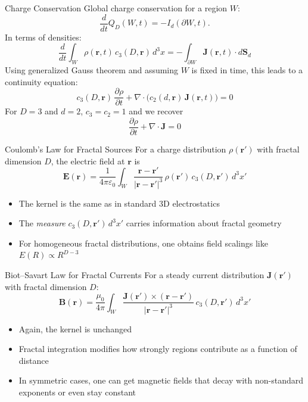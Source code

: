 \documentclass[11pt]{beamer}
\begin{document}
\begin{frame}{Charge Conservation}
Global charge conservation for a region $W$:
\begin{equation*}
  \frac{d}{dt} Q_D(W,t) = - I_d(\partial W,t) .
\end{equation*}
In terms of densities:
\begin{equation*}
  \frac{d}{dt} \int_W \rho(\bm r,t)\, c_3(D,\bm r)\, d^3x
  = - \int_{\partial W} \bm J(\bm r,t) \cdot d\bm S_d
\end{equation*}
Using generalized Gauss theorem and assuming $W$ is fixed in time, this leads to a continuity equation:
\begin{equation*}
  c_3(D,\bm r)\, \frac{\partial \rho}{\partial t}
  + \nabla \cdot \bigl( c_2(d,\bm r)\, \bm J(\bm r,t) \bigr) = 0
\end{equation*}
For $D = 3$ and $d = 2$, $c_3 = c_2 = 1$ and we recover
\begin{equation*}
  \frac{\partial \rho}{\partial t} + \nabla \cdot \bm J = 0
\end{equation*}
\end{frame}

\begin{frame}{Coulomb’s Law for Fractal Sources}
For a charge distribution $\rho(\bm r')$ with fractal dimension $D$, the electric field at $\bm r$ is
\begin{equation*}
  \bm E(\bm r) = \frac{1}{4\pi \varepsilon_0}
  \int_W \frac{\bm r - \bm r'}{\lvert \bm r - \bm r' \rvert^3}\,
  \rho(\bm r')\, c_3(D,\bm r')\, d^3x'
\end{equation*}
\begin{itemize}
  \item The kernel is the same as in standard 3D electrostatics
  \item The \emph{measure} $c_3(D,\bm r')\, d^3x'$ carries information about fractal geometry
  \item For homogeneous fractal distributions, one obtains field scalings like $E(R) \propto R^{D-3}$
\end{itemize}
\end{frame}

\begin{frame}{Biot--Savart Law for Fractal Currents}
For a steady current distribution $\bm J(\bm r')$ with fractal dimension $D$:
\begin{equation*}
  \bm B(\bm r) = \frac{\mu_0}{4\pi}
  \int_W \frac{\bm J(\bm r') \times (\bm r - \bm r')}{\lvert \bm r - \bm r' \rvert^3}\,
  c_3(D,\bm r')\, d^3x'
\end{equation*}
\begin{itemize}
  \item Again, the kernel is unchanged
  \item Fractal integration modifies how strongly regions contribute as a function of distance
  \item In symmetric cases, one can get magnetic fields that decay with non-standard exponents or even stay constant
\end{itemize}
\end{frame}
\end{document}

